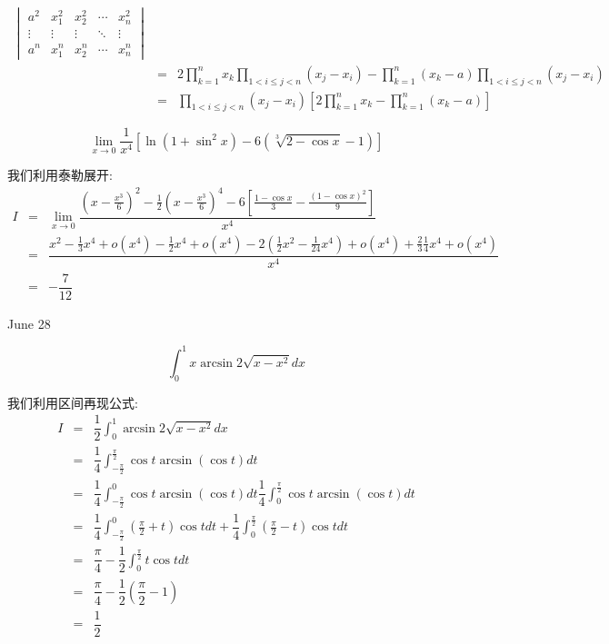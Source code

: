 \begin{solution}
\begin{eqnarray*}
\begin{vmatrix}
			a^2    & x_{1}^2 & x_{2}^2 & \cdots & x_{n}^2\\
			\vdots & \vdots  & \vdots  & \ddots & \vdots\\
			a^n    & x_{1}^n & x_{2}^n & \cdots & x_{n}^n
		\end{vmatrix}\\
		    & = & 2\prod\limits_{k=1}^{n}x_{k}\prod\limits_{1<i\leq j<n}(x_{j}-x_{i})-\prod\limits_{k=1}^{n}(x_{k}-a)\prod\limits_{1<i\leq j<n}(x_{j}-x_{i})\\
		    & = & \prod\limits_{1<i\leq j<n}(x_{j}-x_{i})\left[ 2\prod\limits_{k=1}^{n}x_{k}-\prod\limits_{k=1}^{n}(x_{k}-a)\right] 
	\end{eqnarray*}
\end{solution}

\begin{example}[][Exam: 32.4.12]
	$$\lim\limits_{x\to 0}\dfrac{1}{x^4}\left[ \ln(1+\sin^2 x)-6(\sqrt[3]{2-\cos x}-1)\right]$$
\end{example}

\begin{solution}
	
	我们利用泰勒展开: 
	\begin{eqnarray*}
		I&=&\lim\limits_{x\to 0}\dfrac{(x-\frac{x^3}{6})^2-\frac{1}{2}(x-\frac{x^3}{6})^4-6[\frac{1-\cos x}{3}-\frac{(1-\cos x)^2}{9}]}{x^4}\\
		&=&\dfrac{x^2-\frac{1}{3}x^4+o(x^4)-\frac{1}{2}x^4+o(x^4)-2(\frac{1}{2}x^2-\frac{1}{24}x^4)+o(x^4)+\frac{2}{3}\frac{1}{4}x^4+o(x^4)}{x^4}\\
		&=&-\dfrac{7}{12}
	\end{eqnarray*}
\end{solution}


\textcolor{purplea}{June 28}

\begin{example}[][Exam: 32.4.13]
	$$\int_{0}^{1}x\arcsin 2\sqrt{x-x^2}dx$$
\end{example}

\begin{solution}
	
	我们利用区间再现公式: 
	\begin{eqnarray*}
		I&=&\dfrac{1}{2}\int_{0}^{1}\arcsin2\sqrt{x-x^2}dx\\
		&=&\dfrac{1}{4}\int_{-\frac{\pi}{2}}^{\frac{\pi}{2}}\cos t\arcsin (\cos t)dt\\
		&=&\dfrac{1}{4}\int_{-\frac{\pi}{2}}^{0}\cos t\arcsin (\cos t)dt\dfrac{1}{4}\int_{0}^{\frac{\pi}{2}}\cos t\arcsin (\cos t)dt\\
		&=&\dfrac{1}{4}\int_{-\frac{\pi}{2}}^{0}(\frac{\pi}{2}+t)\cos tdt+\dfrac{1}{4}\int_{0}^{\frac{\pi}{2}}(\frac{\pi}{2}-t)\cos tdt\\
		&=&\dfrac{\pi}{4}-\dfrac{1}{2}\int_{0}^{\frac{\pi}{2}}t\cos tdt\\
		&=&\dfrac{\pi}{4}-\dfrac{1}{2}(\dfrac{\pi}{2}-1)\\
		&=&\dfrac{1}{2}
	\end{eqnarray*}
	
	
\end{solution}

